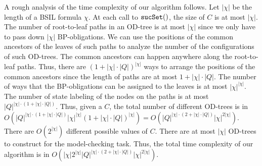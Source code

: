 \documentclass[11pt]{article}
\newcommand{\ttsynsuc}{\mbox{\tt sucSet}}
\begin{document}
A rough analysis of the time complexity of our algorithm follows. 
Let $|\chi|$ be the length of a BSIL formula $\chi$. 
At each call to $\ttsynsuc()$, the size of $C$ is at most $|\chi|$.  
The number of root-to-leaf paths in an OD-tree is at most
$|\chi|$ since we only have to pass down $|\chi|$ BP-obligations. 
We can use the positions of the common ancestors of the leaves of 
such paths to analyze the number of the configurations of 
such OD-trees. 
The common ancestors can happen anywhere along the root-to-leaf paths. 
Thus, there are $(1+|\chi|\cdot |Q|)^{|\chi|}$ ways to 
arrange the positions of the common ancestors since 
the length of paths are at most $1+|\chi|\cdot |Q|$.  
The number of ways that the BP-obligations can be assigned to the leaves 
is at most $|\chi|^{|\chi|}$.  
The number of state labeling of the nodes on the paths 
is at most $|Q|^{|\chi|\cdot(1+|\chi|\cdot|Q|)}$.  
Thus, given a $C$, the total number of different OD-trees 
is in
$O(|Q|^{|\chi|\cdot(1+|\chi|\cdot|Q|)}
|\chi|^{|\chi|}
(1+|\chi|\cdot |Q|)^{|\chi|})=
O(|Q|^{|\chi|\cdot(2+|\chi|\cdot|Q|)}|\chi|^{2|\chi|})$.  
There are $O(2^{|\chi|})$ different possible values of $C$.  
There are at most $|\chi|$ OD-trees to construct for 
the model-checking task. 
Thus, the total time complexity of our algorithm is in
$O(|\chi|2^{|\chi|}|Q|^{|\chi|\cdot(2+|\chi|\cdot|Q|)}|\chi|^{2|\chi|})$.    
\end{document}
